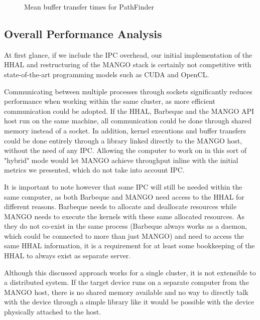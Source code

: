 \begin{figure}%
    \centering
    \qquad
    \captionsetup{justification=centering}
    \caption{Mean buffer transfer times for PathFinder}%
    \label{fig:pathfinder_buffer_transfers_mean_ipc}%
\end{figure}

\subsection{Overall Performance Analysis}

At first glance, if we include the IPC overhead, our initial implementation of the HHAL and restructuring of the MANGO stack is certainly not competitive with state-of-the-art programming models such as CUDA and OpenCL. 

Communicating between multiple processes through sockets significantly reduces performance when working within the same cluster, as more efficient communication could be adopted. If the HHAL, Barbeque and the MANGO API host run on the same machine, all communication could be done through shared memory instead of a socket. In addition, kernel executions and buffer transfers could be done entirely through a library linked directly to the MANGO host, without the need of any IPC. Allowing the computer to work on in this sort of "hybrid" mode would let MANGO achieve throughput inline with the initial metrics we presented, which do not take into account IPC.

It is important to note however that some IPC will still be needed within the same computer, as both Barbeque and MANGO need access to the HHAL for different reasons. Barbeque needs to allocate and deallocate resources while MANGO needs to execute the kernels with these same allocated resources. As they do not co-exist in the same process (Barbeque always works as a daemon, which could be connected to more than just MANGO) and need to access the same HHAL information, it is a requirement for at least some bookkeeping of the HHAL to always exist as separate server.

Although this discussed approach works for a single cluster, it is not extensible to a distributed system. If the target device runs on a separate computer from the MANGO host, there is no shared memory available and no way to directly talk with the device through a simple library like it would be possible with the device physically attached to the host. 

